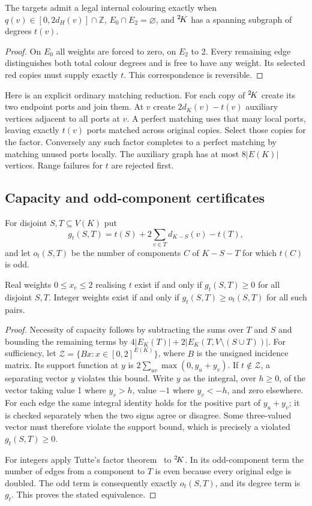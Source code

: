 \begin{proposition}\label{prop:fixedfactor}
The targets admit a legal internal colouring exactly when
$q(v)\in[0,2d_H(v)]\cap\mathbb Z$, $E_0\cap E_2=\varnothing$,
and ${}^{2}\!K$ has a spanning subgraph of degrees $t(v)$.
\end{proposition}
\begin{proof}
On $E_0$ all weights are forced to zero, on $E_2$ to 2. Every
remaining edge distinguishes both total colour degrees and is free
to have any weight. Its selected red copies must supply exactly $t$.
This correspondence is reversible.
\end{proof}

Here is an explicit ordinary matching reduction. For each copy of
${}^{2}\!K$ create its two endpoint ports and join them. At $v$ create
$2d_K(v)-t(v)$ auxiliary vertices adjacent to all ports at $v$.
A perfect matching uses that many local ports, leaving exactly
$t(v)$ ports matched across original copies. Select those copies
for the factor. Conversely any such factor completes to a perfect
matching by matching unused ports locally. The auxiliary graph has
at most $8|E(K)|$ vertices. Range failures for $t$ are rejected first.

\subsection{Capacity and odd-component certificates}

For disjoint $S,T\subseteq V(K)$ put
\[
 g_t(S,T)=t(S)+2\sum_{v\in T}d_{K-S}(v)-t(T),
\]
and let $o_t(S,T)$ be the number of components $C$ of $K-S-T$ for
which $t(C)$ is odd.

\begin{proposition}\label{prop:capacity}
Real weights $0\le x_e\le2$ realising $t$ exist if and only if
$g_t(S,T)\ge0$ for all disjoint $S,T$. Integer weights exist if and
only if $g_t(S,T)\ge o_t(S,T)$ for all such pairs.
\end{proposition}
\begin{proof}
Necessity of capacity follows by subtracting the sums over $T$ and
$S$ and bounding the remaining terms by
$4|E_K(T)|+2|E_K(T,V\setminus(S\cup T))|$.
For sufficiency, let $\mathcal Z=\{Bx:x\in[0,2]^{E(K)}\}$, where
$B$ is the unsigned incidence matrix. Its support function at $y$ is
$2\sum_{uv}\max(0,y_u+y_v)$. If $t\notin\mathcal Z$, a separating
vector $y$ violates this bound. Write $y$ as the integral, over
$h\ge0$, of the vector taking value 1 where $y_v>h$, value $-1$
where $y_v<-h$, and zero elsewhere. For each edge the same integral
identity holds for the positive part of $y_u+y_v$; it is checked
separately when the two signs agree or disagree. Some three-valued
vector must therefore violate the support bound, which is precisely
a violated $g_t(S,T)\ge0$.

For integers apply Tutte's factor theorem~\cite{Tutte54} to ${}^{2}\!K$.
In its odd-component term the number of edges from a component to
$T$ is even because every original edge is doubled. The odd term
is consequently exactly $o_t(S,T)$, and its degree term is $g_t$.
This proves the stated equivalence.
\end{proof}

